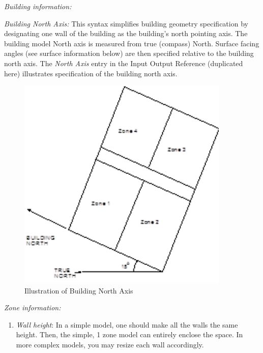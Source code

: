 \emph{Building information:}

\emph{Building North Axis:} This syntax simplifies building geometry specification by designating one wall of the building as the building's north pointing axis. The building model North axis is measured from true (compass) North. Surface facing angles (see surface information below) are then specified relative to the building north axis. The \emph{North Axis} entry in the Input Output Reference (duplicated here) illustrates specification of the building north axis.

\begin{figure}[hbtp] %
\centering
\includegraphics[width=0.9\textwidth, height=0.9\textheight, keepaspectratio=true]{media/image016.png}
\caption{Illustration of Building North Axis \protect \label{fig:illustration-of-building-north-axis}}
\end{figure}

\emph{Zone information:}

\begin{enumerate}
\def\labelenumi{\arabic{enumi}.}
\tightlist
\item
  \emph{Wall height}: In a simple model, one should make all the walls the same height. Then, the simple, 1 zone model can entirely enclose the space. In more complex models, you may resize each wall accordingly.
\end{enumerate}

